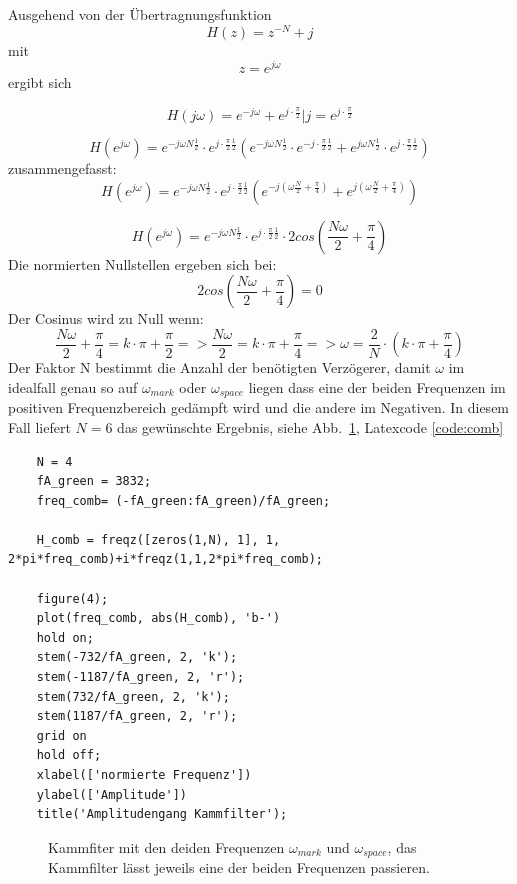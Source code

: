 \documentclass{article}
\begin{document}
Ausgehend von der Übertragnungsfunktion 
$$H(z) = z^{-N} + j$$ 
mit 
$$ z = e^{j\omega} $$
ergibt sich

$$H(j\omega) = e^{-j\omega} + e^{j\cdot \frac{\pi}{2}} | j = e^{j\cdot \frac{\pi}{2}}$$

$$
H(e^{j\omega}) = 
e^{-j\omega N \frac{1}{2}} \cdot e^{j\cdot \frac{\pi}{2} \frac{1}{2}} 
(e^{-j\omega N \frac{1}{2}} \cdot e^{-j\cdot \frac{\pi}{2} \frac{1}{2}} + 
e^{j\omega N \frac{1}{2}} \cdot e^{j\cdot \frac{\pi}{2} \frac{1}{2}}) 
$$
zusammengefasst:
$$ H(e^{j\omega}) = e^{-j\omega N \frac{1}{2}} \cdot e^{j\cdot \frac{\pi}{2} \frac{1}{2}}  
(e^{-j(\omega \frac{N}{2} + \frac{\pi}{4})} + e^{j(\omega \frac{N}{2} + \frac{\pi}{4})}) 
$$

$$
H(e^{j\omega}) = e^{-j\omega N \frac{1}{2}} \cdot e^{j\cdot \frac{\pi}{2} \frac{1}{2}} \cdot 2cos(\frac{N\omega}{2} + \frac{\pi}{4})
$$
Die normierten Nullstellen ergeben sich bei:
$$2cos(\frac{N\omega}{2} + \frac{\pi}{4}) = 0 $$
Der Cosinus wird zu Null wenn:
$$
\frac{N\omega}{2} + \frac{\pi}{4} = k\cdot\pi + \frac{\pi}{2} =>  \frac{N\omega}{2} = k \cdot \pi + \frac{\pi}{4} => \omega = \frac{2}{N} \cdot (k \cdot \pi + \frac{\pi}{4})
$$
Der Faktor N bestimmt die Anzahl der benötigten Verzögerer, damit $\omega$ im idealfall genau so auf $\omega_{mark}$ oder $\omega_{space}$ liegen dass eine der beiden 
Frequenzen im positiven Frequenzbereich gedämpft wird und die andere im Negativen. In diesem Fall liefert $N=6$ das gewünschte Ergebnis, siehe Abb.~\ref{fig:comb}, Latexcode \ref{code:comb}
\begin{center}
    \label{code:comb}
\begin{verbatim}
    N = 4
    fA_green = 3832;
    freq_comb= (-fA_green:fA_green)/fA_green;
    
    H_comb = freqz([zeros(1,N), 1], 1, 2*pi*freq_comb)+i*freqz(1,1,2*pi*freq_comb);
    
    figure(4);
    plot(freq_comb, abs(H_comb), 'b-')
    hold on;
    stem(-732/fA_green, 2, 'k');
    stem(-1187/fA_green, 2, 'r');
    stem(732/fA_green, 2, 'k');
    stem(1187/fA_green, 2, 'r');
    grid on
    hold off;
    xlabel(['normierte Frequenz'])
    ylabel(['Amplitude'])
    title('Amplitudengang Kammfilter');
\end{verbatim}
\end{center}

\begin{figure}[!h]
    \label{fig:comb}
    \centering
    \def\svgscale{0.3}
    \def\svgwidth{\columnwidth}
    
    \caption{Kammfiter mit den deiden Frequenzen $\omega_{mark}$ und $\omega_{space}$, das Kammfilter lässt jeweils eine der beiden Frequenzen passieren.}
\end{figure}






\end{document}
